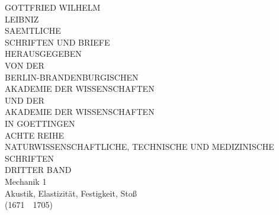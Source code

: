 \documentclass[fontsize=10pt,twoside,DIV=calc,BCOR0mm,headings=small,numbers=enddot,headinclude=false,footinclude=true,
openany]{scrbook}
\begin{document}
        \begin{titlepage}
        \begin{center}
        {\huge GOTTFRIED WILHELM}\\
        \vspace*{7.5mm}
        {\Huge LEIBNIZ}\\
        \vspace*{10.5mm}
        {\Large SAEMTLICHE\\
        SCHRIFTEN UND BRIEFE}\\
        \vspace*{13mm}
        {\large HERAUSGEGEBEN\\
        VON DER}\\
        \vspace*{5.5mm}
        {\Large BERLIN-BRANDENBURGISCHEN\\
        AKADEMIE DER WISSENSCHAFTEN}\\
        {\large UND DER}\\
        {\Large AKADEMIE DER WISSENSCHAFTEN\\
        IN GOETTINGEN\\
        \vspace*{15mm}
        ACHTE REIHE}\\
        {\large NATURWISSENSCHAFTLICHE, TECHNISCHE UND MEDIZINISCHE SCHRIFTEN}\\
        \vspace*{4.5mm}
        {\Large DRITTER BAND}\\
        \vspace{3mm}
         {\Large Mechanik 1}\\
         \vspace{2mm}
        {\Large Akustik, Elastizität, Festigkeit, Stoß}\\
	\vspace{2mm}
	{\Large(1671\ \textendash\ 1705)}
        \end{center}
        \end{titlepage}





\newpage
\newpage
\end{document}
